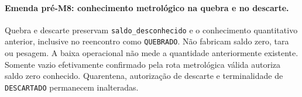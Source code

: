 \paragraph{Emenda pré-M8: conhecimento metrológico na quebra e no descarte.}
Quebra e descarte preservam \texttt{saldo\_desconhecido} e o conhecimento quantitativo anterior, inclusive no reencontro como \texttt{QUEBRADO}. Não fabricam saldo zero, tara ou pesagem. A baixa operacional não mede a quantidade anteriormente existente. Somente vazio efetivamente confirmado pela rota metrológica válida autoriza saldo zero conhecido. Quarentena, autorização de descarte e terminalidade de \texttt{DESCARTADO} permanecem inalteradas.
